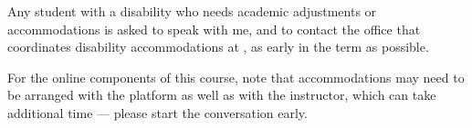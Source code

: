 Any student with a disability who needs academic adjustments or accommodations
is asked to speak with me, and to contact the office that coordinates disability
accommodations at \GetInstitution, as early in the term as possible.

For the online components of this course, note that accommodations may need to
be arranged with the platform as well as with the instructor, which can take
additional time --- please start the conversation early.
